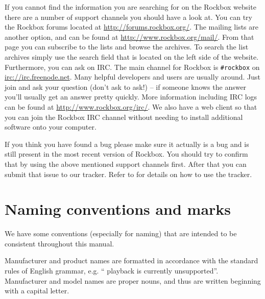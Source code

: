 If you cannot find the information you are searching for on the Rockbox
website there are a number of support channels you should have a look at.
You can try the Rockbox forums located at \url{http://forums.rockbox.org/}.
The mailing lists are another option, and can be found at
\url{http://www.rockbox.org/mail/}. From that page you can subscribe to the
lists and browse the archives. To search the list archives simply use
the search field that is located on the left side of the website.
Furthermore,  you can ask on IRC. The main channel for Rockbox is
\texttt{\#rockbox} on \url{irc://irc.freenode.net}. Many helpful developers
and users are usually around. Just join and ask your question (don't ask to
ask!) -- if someone knows the answer you'll
usually get an answer pretty quickly. More information including IRC logs
can be found at \url{http://www.rockbox.org/irc/}. We also have a web client
so that you can join the Rockbox IRC channel without needing
to install additional software onto your computer.

If you think you have found a bug please make sure it actually is a bug and is
still present in the most recent version of Rockbox. You should try to
confirm that by using the above mentioned support channels first. After that
you can submit that issue to our tracker. Refer to 
for details on how to use the tracker.


\section{Naming conventions and marks}
We have some conventions (especially for naming) that are intended to be
consistent throughout this manual.

Manufacturer and product names are formatted in accordance with the standard
rules of English grammar, e.g. ``\playerman{} playback is currently
unsupported''. Manufacturer and model names are proper nouns, and
thus are written beginning with a capital letter.


